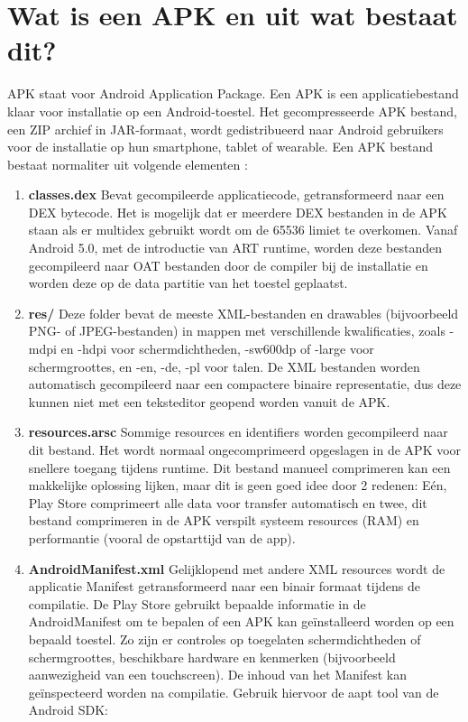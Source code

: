 \section{Wat is een APK en uit wat bestaat dit?}
APK staat voor Android Application Package. Een APK is een applicatiebestand klaar voor installatie op een Android-toestel. Het gecompresseerde APK bestand, een ZIP archief in JAR-formaat, wordt gedistribueerd naar Android gebruikers voor de installatie op hun smartphone, tablet of wearable. \autocite{PCMag}
Een APK bestand bestaat normaliter uit volgende elementen : 
\begin{enumerate}
	\setlength\itemsep{2em}
\item \textbf{classes.dex} \newline
Bevat gecompileerde applicatiecode, getransformeerd naar een DEX bytecode. Het is mogelijk dat er meerdere DEX bestanden in de APK staan als er multidex gebruikt wordt om de 65536 limiet te overkomen. Vanaf Android 5.0, met de introductie van ART runtime, worden deze bestanden gecompileerd naar OAT bestanden door de compiler bij de installatie en worden deze op de data partitie van het toestel geplaatst. 
\item \textbf{res/} \newline
Deze folder bevat de meeste XML-bestanden en drawables (bijvoorbeeld PNG- of JPEG-bestanden) in mappen met verschillende kwalificaties, zoals -mdpi en -hdpi voor schermdichtheden, -sw600dp of -large voor schermgroottes, en -en, -de, -pl voor talen. De XML bestanden worden automatisch gecompileerd naar een compactere binaire representatie, dus deze kunnen niet met een teksteditor geopend worden vanuit de APK. 
\item \textbf{resources.arsc}\newline
Sommige resources en identifiers worden gecompileerd naar dit bestand. Het wordt normaal ongecomprimeerd opgeslagen in de APK voor snellere toegang tijdens runtime. Dit bestand manueel comprimeren kan een makkelijke oplossing lijken, maar dit is geen goed idee door 2 redenen: Eén, Play Store comprimeert alle data voor transfer automatisch en twee, dit bestand comprimeren in de APK verspilt systeem resources (RAM) en performantie (vooral de opstarttijd van de app).
\item \textbf{AndroidManifest.xml}\newline
Gelijklopend met andere XML resources wordt de applicatie Manifest getransformeerd naar een binair formaat tijdens de compilatie. De Play Store gebruikt bepaalde informatie in de AndroidManifest om te bepalen of een APK kan geïnstalleerd worden op een bepaald toestel. Zo zijn er controles op toegelaten schermdichtheden of schermgroottes, beschikbare hardware en kenmerken (bijvoorbeeld aanwezigheid van een touchscreen). De inhoud van het Manifest kan geïnspecteerd worden na compilatie. Gebruik hiervoor de aapt tool van de Android SDK: 

\end{enumerate}
